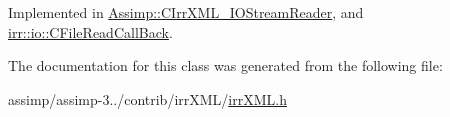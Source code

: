 Implemented in \hyperlink{class_assimp_1_1_c_irr_x_m_l___i_o_stream_reader_acef5ac4ae18c425158c61d0c47e45247}{Assimp\+::\+C\+Irr\+X\+M\+L\+\_\+\+I\+O\+Stream\+Reader}, and \hyperlink{classirr_1_1io_1_1_c_file_read_call_back_ab2d4c4e10cd2b03af1173fbc25f87741}{irr\+::io\+::\+C\+File\+Read\+Call\+Back}.



The documentation for this class was generated from the following file\+:\begin{DoxyCompactItemize}
\item 
assimp/assimp-\/3../contrib/irr\+X\+M\+L/\hyperlink{irr_x_m_l_8h}{irr\+X\+M\+L.\+h}\end{DoxyCompactItemize}
